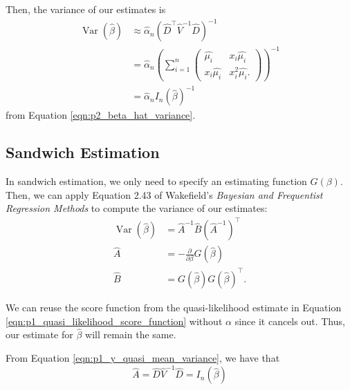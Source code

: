 \documentclass[letterpaper,11pt]{article}
\begin{document}
\begin{enumerate}
\begin{description}
    Then, the variance of our estimates is
    \begin{align}
      \operatorname{Var}\left(
      \hat{\beta}
      \right)
      &\approx
      \hat{\alpha}_n\left(\hat{D}^\intercal \hat{V}^{-1} \hat{D}\right)^{-1} \nonumber\\
      &= \hat{\alpha}_n\left(\sum_{i=1}^n
        \begin{pmatrix}
          \hat{\mu_i} & x_i\hat{\mu_i} \\
          x_i\hat{\mu_i} & x_i^2\hat{\mu_i}.
        \end{pmatrix}\right)^{-1}
        \nonumber\\
      &= \hat{\alpha}_nI_n\left(\hat{\beta}\right)^{-1}
    \end{align}
    from Equation \ref{eqn:p2_beta_hat_variance}.

    \subsection*{Sandwich Estimation}

    In sandwich estimation, we only need to specify an estimating function
    $G\left(\beta\right)$. Then, we can apply Equation 2.43 of Wakefield's
    \emph{Bayesian and Frequentist Regression Methods} to compute the variance
    of our estimates:
    \begin{align}
      \operatorname{Var}\left(\hat{\beta}\right)
      &= \hat{A}^{-1}\hat{B}\left(\hat{A}^{-1}\right)^\intercal \nonumber\\
      \hat{A} &= -\frac{\partial}{\partial\beta}G\left(\hat{\beta}\right) \nonumber\\
      \hat{B} &= G\left(\hat{\beta}\right)G\left(\hat{\beta}\right)^\intercal. \nonumber
    \end{align}

    We can reuse the score function from the quasi-likelihood estimate in
    Equation \ref{eqn:p1_quasi_likelihood_score_function} without $\alpha$ since
    it cancels out. Thus, our estimate for $\hat{\beta}$ will remain the same.

    From Equation \ref{eqn:p1_y_quasi_mean_variance}, we have that
    \begin{equation}
      \hat{A} = \hat{D}\hat{V}^{-1}\hat{D} = I_n\left(\hat{\beta}\right)
    \end{equation}


\end{description}
\end{enumerate}
\end{document}
